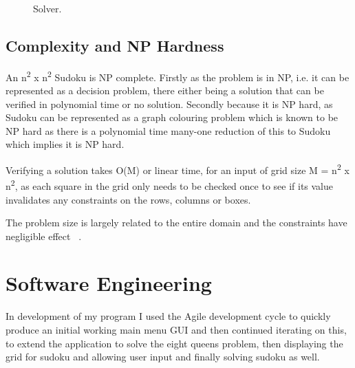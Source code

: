 \documentclass[]{final_report}
\begin{document}
\begin{figure}[h]
	\centering
	\fboxsep 2mm
	\caption{\label{fig:solver} Solver.}
\end{figure}

\newpage

\section*{Complexity and NP Hardness}

An n\textsuperscript{2} x n\textsuperscript{2} Sudoku is NP complete. Firstly as the problem is in NP, i.e. it can be represented as a decision problem, there either being a solution that can be verified in polynomial time or no solution. Secondly because it is NP hard, as Sudoku can be represented as a graph colouring problem which is known to be NP hard as there is a polynomial time many-one reduction of this to Sudoku which implies it is NP hard.

Verifying a solution takes O(M) or linear time, for an input of grid size M = n\textsuperscript{2} x n\textsuperscript{2}, as each square in the grid only needs to be checked once to see if its value invalidates any constraints on the rows, columns or boxes.

The problem size is largely related to the entire domain and the constraints have negligible effect ~\cite{TSANG:1993}.

\chapter*{Software Engineering}

In development of my program I used the Agile development cycle to quickly produce an initial working main menu GUI and then continued iterating on this, to extend the application to solve the eight queens problem, then displaying the grid for sudoku and allowing user input and finally solving sudoku as well.
\end{document}
